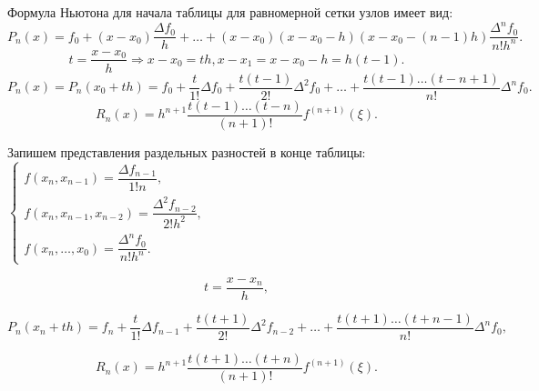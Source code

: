 Формула Ньютона для начала таблицы для равномерной сетки узлов имеет вид:
\begin{equation*}
  P_n(x) = f_0 + (x - x_0) \dfrac{\Delta f_0}{h} + \ldots + (x - x_0)(x - x_0 - h) (x - x_0 - (n-1)h) \dfrac{\Delta^n f_0}{n! h^n}.
\end{equation*}
\begin{equation*}
  t = \dfrac{x - x_0}{h} \Rightarrow x - x_0 = th, x - x_1 = x - x_0 - h = h(t-1).
\end{equation*}
\begin{equation*}
  P_n(x) = P_n (x_0 + th) = f_0 + \dfrac{t}{1!} \Delta f_0 + \dfrac{t (t-1)}{2!} \Delta^2 f_0 + \ldots + \dfrac{t (t-1) \ldots (t - n + 1)}{n!} \Delta^n f_0.
\end{equation*}
\begin{equation*}
  R_n(x) = h^{n+1} \dfrac{t(t-1)\ldots(t-n)}{(n+1)!} f^{(n+1)} (\xi).
\end{equation*}

Запишем представления раздельных разностей в конце таблицы:
$\begin{cases}
  f(x_n, x_{n-1}) = \dfrac{\Delta f_{n-1}}{1! n}, \\
  f(x_n, x_{n-1}, x_{n-2}) = \dfrac{\Delta^2 f_{n-2}}{2! h^2}, \\
  f(x_n, \ldots, x_0) = \dfrac{\Delta^n f_0}{n! h^n}.
\end{cases}$

\begin{equation*}
  t = \dfrac{x - x_n}{h},
\end{equation*}

\begin{equation*}
  P_n(x_n + th) = f_n + \dfrac{t}{1!} \Delta f_{n-1} + \dfrac{t (t + 1)}{2!} \Delta^2 f_{n-2} + \ldots + \dfrac{t (t + 1) \ldots (t + n - 1)}{n!} \Delta^n f_0,
\end{equation*}

\begin{equation*}
  R_n(x) = h^{n+1} \dfrac{t(t+1)\ldots (t+n)}{(n+1)!} f^{(n+1)} (\xi).
\end{equation*}
